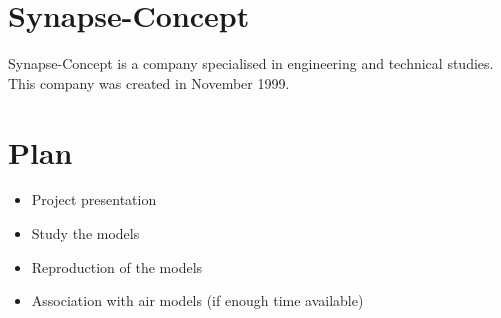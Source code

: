 \documentclass{article}
\begin{document}
\section*{Synapse-Concept}

Synapse-Concept is a company specialised in engineering and technical studies. This company was created in November 1999.

\section*{Plan}

\begin{itemize}
    \item Project presentation
    \item Study the models
    \item Reproduction of the models
    \item Association with air models (if enough time available)
\end{itemize}
\pagebreak
\end{document}
